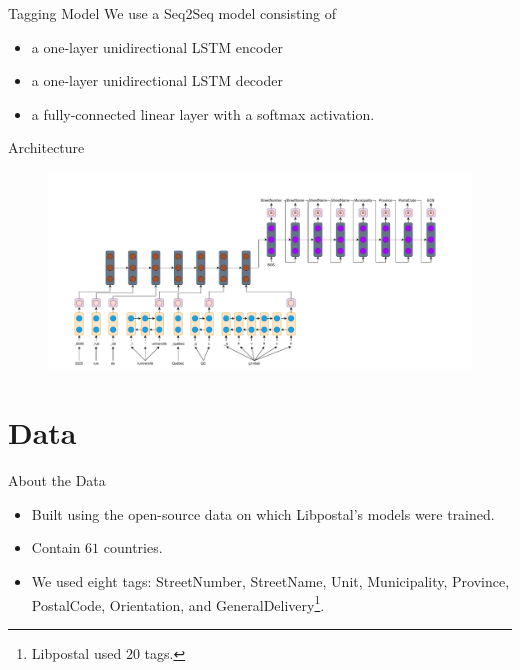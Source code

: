 \documentclass{beamer}
\begin{document}
	\begin{frame}{Tagging Model}
		We use a Seq2Seq model consisting of
		\begin{itemize}
			\item<2-> a one-layer unidirectional LSTM encoder
			\item<3-> a one-layer unidirectional LSTM decoder
			\item<4-> a fully-connected linear layer with a softmax activation. 
		\end{itemize}
		
	\end{frame}

	\begin{frame}{Architecture}
		\begin{figure}[h!]
			\centering
			\includegraphics[width=1.1\textwidth,height=\textheight,keepaspectratio]{Network.pdf}
		\end{figure}
	\end{frame}
	
	\section{Data}
	\begin{frame}{About the Data}
		\begin{itemize}
			\item<1-> Built using the open-source data on which Libpostal's models were trained.
			\item<2-> Contain $61$ countries.
			\item<2-> We used eight tags: StreetNumber, StreetName, Unit, Municipality, Province, PostalCode, Orientation, and GeneralDelivery\footnote{Libpostal used $20$ tags.}.
		\end{itemize}
	\end{frame}	
\end{document}
